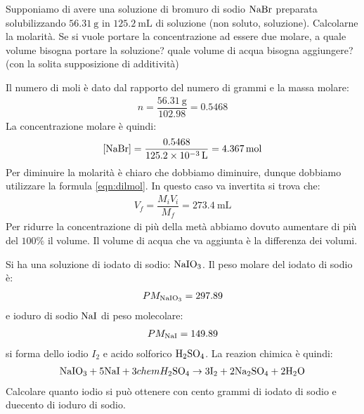\documentclass[../AppuntiChimica]{subfiles}
\begin{document}
	\begin{exe}
		Supponiamo di avere una soluzione di bromuro di sodio $ \text{NaBr} $ preparata solubilizzando $ \SI{56.31}{\gram} $ in $ \SI{125.2}{\milli\liter} $ di soluzione (non soluto, soluzione). Calcolarne la molarità. Se si vuole portare la concentrazione ad essere due molare, a quale volume bisogna portare la soluzione? quale volume di acqua bisogna aggiungere? (con la solita supposizione di additività)
	\end{exe}
	\begin{svol}
		Il numero di moli è dato dal rapporto del numero di grammi e la massa molare:
		\begin{gather}
			n=\dfrac{\SI{56.31}{\gram}}{102.98}=0.5468
		\end{gather}
		La concentrazione molare è quindi:
		\begin{gather}
		\left[\text{NaBr}\right]=\dfrac{0.5468}{\SI{125.2e-3}{\liter}}=\SI{4.367}{\mole}
		\end{gather}
		Per diminuire la molarità è chiaro che dobbiamo diminuire, dunque dobbiamo utilizzare la formula \ref{eqn:dilmol}. In questo caso va invertita si trova che:
		\begin{gather}
		V_{f}=\dfrac{M_{i}V_{i}}{M_{f}}=\SI{273.4}{\milli\liter}
		\end{gather}
		Per ridurre la concentrazione di più della metà abbiamo dovuto aumentare di più del $ 100\% $ il volume. Il volume di acqua che va aggiunta è la differenza dei volumi.
	\end{svol}
	\begin{exe}
		Si ha una soluzione di iodato di sodio: $ \text{NaIO}_{3} $. Il peso molare del iodato di sodio è:
		\begin{gather}
			PM_{\text{NaIO}_{3}}=297.89
		\end{gather}
		e ioduro di sodio $ \text{NaI} $ di peso molecolare:
		\begin{gather}
			PM_{\text{NaI}}=149.89
		\end{gather}
		si forma dello iodio $ I_{2} $ e acido solforico $ \text{H}_{2}\text{SO}_{4} $. La reazion chimica è quindi:
		\begin{gather}
			\text{NaIO}_{3}+5\text{NaI}+3chem{H}_{2}\text{SO}_{4} \to 3\text{I}_{2}+2 \text{Na}_{2}\text{SO}_{4}+ 2\text{H}_{2}\text{O}
		\end{gather}
		Calcolare quanto iodio si può ottenere con cento grammi di iodato di sodio e duecento di ioduro di sodio.
	\end{exe}
\end{document}

